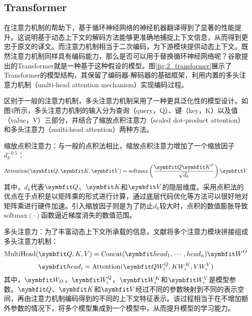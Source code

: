 \subsection{Transformer}
在注意力机制的帮助下，基于循环神经网络的神经机器翻译得到了显著的性能提升。这说明基于动态上下文的解码方法能够更准确地捕捉上下文信息，从而得到更忠于原文的译文。而注意力机制相当于二次编码，为下游模块提供动态上下文。既然注意力机制同样具有编码能力，那么是否可以用于替换循环神经网络呢？谷歌提出的Transformer\cite{5_DBLP:journals/corr/VaswaniSPUJGKP17}就是一种基于这种假设的模型。图\ref{fig:2_transformer}展示了Transformer的模型结构，其保留了编码器-解码器的基础框架，利用内置的多头注意力机制（multi-head attention mechanism）实现编码过程。



区别于一般的注意力机制，多头注意力机制采用了一种更具泛化性的模型设计。如图4所示，多头注意力机制的输入分为查询（query，Q）、键（key，K）以及值（value，V）三部分，并结合了缩放点积注意力（scaled dot-product attention）和多头注意力（multi-head attention）两种方法。

{\sffamily 缩放点积注意力：}与一般的点积法相比，缩放点积注意力增加了一个缩放因子$d_k^{-0.5}$：
\begin{equation}
    \mathrm{Attention}(\Vector{Q},\Vector{K},\Vector{V}) = \mathrm{softmax} \left( \frac{\Vector{Q}\Vector{K}^T}{\sqrt{d_k}} \right) \Vector{V}
\end{equation}
其中，$d_k$代表$\Vector{Q}$、$\Vector{K}$和$\Vector{V}$的隐层维度。采用点积法的优点在于点积是以矩阵乘的形式进行计算，通过底层代码优化等方法可以很好地对矩阵乘进行硬件加速。引入缩放因子则是为了防止$d_k$较大时，点积的数值膨胀导致$\mathrm{softmax}(\cdot)$函数逼近梯度消失的数值范围。

{\sffamily 多头注意力：}为了丰富动态上下文所承载的信息，文献\cite{5_DBLP:journals/corr/VaswaniSPUJGKP17}将多个注意力模块拼接组成多头注意力机制：
\begin{equation}
    \mathrm{MultiHead}(\Vector{Q,K,V}) = \mathrm{Concat}(\Vector{head_1, \cdots, head_n})\Vector{W^O}
\end{equation}
\begin{equation}
    \Vector{head_i} = \mathrm{Attention}(\Vector{Q W_i^Q,K W_i^K,V W_i^V})
\end{equation}
其中，$\Vector{W_O}$，$\Vector{W_i^Q}$，$\Vector{W_i^K}$和$\Vector{W_i^V}$是模型参数。$\Vector{Q}$、$\Vector{K}$和$\Vector{V}$经过不同的参数映射到不同的表示空间，再由注意力机制编码得到的不同的上下文特征表示。该过程相当于在不增加额外参数的情况下，将多个模型集成到一个模型中，从而提升模型的学习能力。

